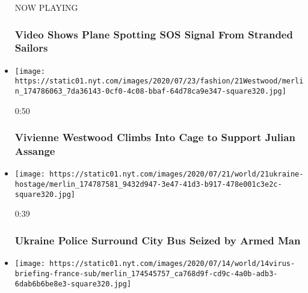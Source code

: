 \begin{itemize}
  NOW PLAYING

  \hypertarget{video-shows-plane-spotting-sos-signal-from-stranded-sailors-1}{%
  \subsubsection{Video Shows Plane Spotting SOS Signal From Stranded
  Sailors}\label{video-shows-plane-spotting-sos-signal-from-stranded-sailors-1}}
\item
  \href{https://www.nytimes.com/video/us/100000007249534/vivienne-westwood-canary-julian-assange.html?action=click\&module=video-series-bar\&region=header\&pgtype=Article\&playlistId=video/world}{}

  \texttt{[image: https://static01.nyt.com/images/2020/07/23/fashion/21Westwood/merlin\_174786063\_7da36143-0cf0-4c08-bbaf-64d78ca9e347-square320.jpg]}

  0:50

  \hypertarget{vivienne-westwood-climbs-into-cage-to-support-julian-assange}{%
  \subsubsection{Vivienne Westwood Climbs Into Cage to Support Julian
  Assange}\label{vivienne-westwood-climbs-into-cage-to-support-julian-assange}}
\item
  \href{https://www.nytimes.com/video/us/100000007249315/hostages-on-ukraine-city-bus.html?action=click\&module=video-series-bar\&region=header\&pgtype=Article\&playlistId=video/world}{}

  \texttt{[image: https://static01.nyt.com/images/2020/07/21/world/21ukraine-hostage/merlin\_174787581\_9432d947-3e47-41d3-b917-478e001c3e2c-square320.jpg]}

  0:39

  \hypertarget{ukraine-police-surround-city-bus-seized-by-armed-man}{%
  \subsubsection{Ukraine Police Surround City Bus Seized by Armed
  Man}\label{ukraine-police-surround-city-bus-seized-by-armed-man}}
\item
  \href{https://www.nytimes.com/video/world/europe/100000007237802/france-bastille-day-virus.html?action=click\&module=video-series-bar\&region=header\&pgtype=Article\&playlistId=video/world}{}

  \texttt{[image: https://static01.nyt.com/images/2020/07/14/world/14virus-briefing-france-sub/merlin\_174545757\_ca768d9f-cd9c-4a0b-adb3-6dab6b6be8e3-square320.jpg]}


\end{itemize}
